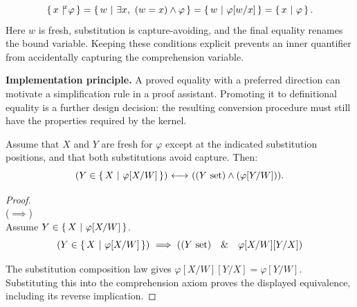 \[
\ccc{x}{x}{\phi}
=\cc{w}{\exists x,\ (w=x)\land\phi}
=\cc{w}{\phi[w/x]}
=\cc{x}{\phi}.
\]
Here $w$ is fresh, substitution is capture-avoiding, and the final equality
renames the bound variable. Keeping these conditions explicit prevents an
inner quantifier from accidentally capturing the comprehension variable.

\textbf{Implementation principle.} A proved equality with a preferred
direction can motivate a simplification rule in a proof assistant. Promoting
it to definitional equality is a further design decision: the resulting
conversion procedure must still have the properties required by the kernel.

\iffalse

\[
(X\in\cc{X}{\varphi}) \iff ((X\set)\land \varphi)
\]

Let's substitute X with some variable Y, which is different from X.\\
\[
(Y\in\cc{X}{\varphi}) \iff ((Y\set)\land \varphi[Y/X])
\]
Do the same step but for $\varphi[X/W]$.
\[
(X\in\cc{X}{\varphi[X/W]}) \iff ((X\set)\land \varphi[X/W])
\]
\[
(Y\in\cc{X}{\varphi[X/W]}) \iff ((Y\set)\land \varphi[X/W][Y/X])
\]

Is the following statement true:\\
"If
$\varphi[X/W]$ is defined(sic!), and if $\varphi[X/W][Y/X]$ is defined(btw the first follows from th second), and if (Y is not a free variable of $\varphi$) then $\varphi[X/W][Y/X]$ is equal to $\varphi[Y/W]$"?

...\\


Now, let's prove "old class comprehesion" statement.
\fi

\begin{theorem}
Assume that $X$ and $Y$ are fresh for $\varphi$ except at the indicated substitution positions, and that both substitutions avoid capture. Then:
\[
(Y\in\left\{\,X\ \middle|\ \varphi[X/W]\,\right\}) {\ \longleftrightarrow\ } ((Y\mathrm{\ set})\land(\varphi[Y/W])).
\]
\end{theorem}
\begin{proof}\ \\
($\implies$)\\
Assume $Y\in\left\{\,X\ \middle|\ \varphi[X/W]\,\right\}$.
\[
(Y\in\left\{\,X\ \middle|\ \varphi[X/W]\,\right\})
\ \Longrightarrow\ 
(
(Y\mathrm{\ set})
\quad\&\quad
\varphi[X/W][Y/X]
)
\]

The substitution composition law gives
$\varphi[X/W][Y/X]=\varphi[Y/W]$. Substituting this into the comprehension
axiom proves the displayed equivalence, including its reverse implication.
\end{proof}


